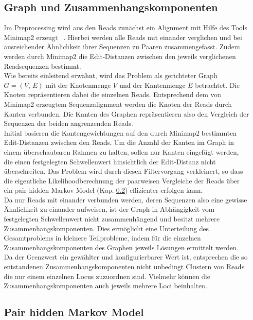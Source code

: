 \subsection{Graph und Zusammenhangskomponenten} \label{subsec:sol_graph}

Im Preprocessing wird aus den Reads zunächst ein Alignment mit Hilfe des Tools Minimap2  erzeugt ~\cite{li_2018}. Hierbei werden alle Reads mit einander verglichen und bei ausreichender Ähnlichkeit ihrer Sequenzen zu Paaren zusammengefasst. Zudem werden durch Minimap2 die Edit-Distanzen zwischen den jeweils verglichenen Readsequenzen bestimmt. \\

Wie bereits einleitend erwähnt, wird das Problem als gerichteter Graph $G=(V, \, E)$ mit der Knotenmenge $V$ und der Kantenmenge $E$ betrachtet. Die Knoten repräsentieren dabei die einzelnen Reads. Entsprechend dem von Minimap2 erzeugtem Sequenzalignment werden die Knoten der Reads durch Kanten verbunden. Die Kanten des Graphen repräsentieren also den Vergleich der Sequenzen der beiden angrenzenden Reads.\\

Initial basieren die Kantengewichtungen auf den durch Minimap2 bestimmten Edit-Distanzen zwischen den Reads. Um die Anzahl der Kanten im Graph in einem überschaubaren Rahmen zu halten, sollen nur Kanten eingefügt werden, die einen festgelegten Schwellenwert hinsichtlich der Edit-Distanz nicht überschreiten. Das Problem wird durch diesen Filtervorgang verkleinert, so dass die eigentliche Likelihoodberechnung der paarweisen Vergleiche der Reads über ein pair hidden Markov Model (Kap. \ref{subsec:sol_phmm}) effizienter erfolgen kann. \\

Da nur Reads mit einander verbunden werden, deren Sequenzen also eine gewisse Ähnlichkeit zu einander aufweisen, ist der Graph in Abhängigkeit vom festgelegten Schwellenwert nicht zusammenhängend und besitzt mehrere Zusammenhangskomponenten. Dies ermöglicht eine Unterteilung des Gesamtproblems in kleinere Teilprobleme, indem für die einzelnen Zusammenhangskomponenten des Graphen jeweils Lösungen ermittelt werden. Da der Grenzwert ein gewählter und konfigurierbarer Wert ist, entsprechen die so entstandenen Zusammenhangskomponenten nicht unbedingt Clustern von Reads die nur einem einzelnen Locus zuzuordnen sind. Vielmehr können die Zusammenhangskomponenten auch jeweils mehrere Loci beinhalten. 

\subsection{Pair hidden Markov Model} \label{subsec:sol_phmm}

